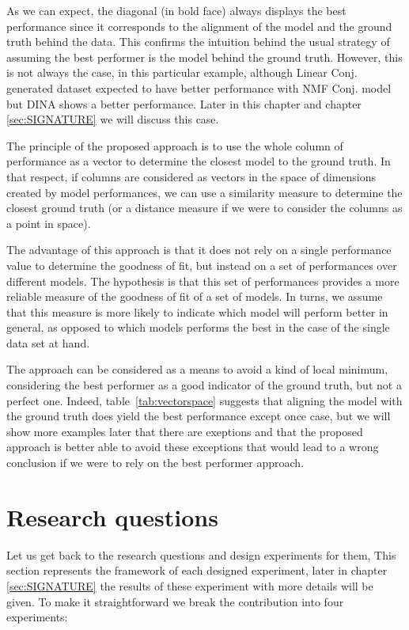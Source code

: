 As we can expect, the diagonal (in bold face) always displays the best performance since it corresponds to the alignment of the model and the ground truth behind the data.  This confirms the intuition behind the usual strategy of assuming the best performer is the model behind the ground truth.  However, this is not always the case, in this particular example, although Linear Conj. generated dataset expected to have  better performance with NMF Conj. model but DINA shows a better performance. Later in this chapter and chapter \ref{sec:SIGNATURE} we will discuss this case.



The principle of the proposed approach is to use the whole column of performance as a vector to determine the closest model to the ground truth.  In that respect, if columns are considered as vectors in the space of dimensions created by model performances, we can use a similarity measure to determine the closest ground truth (or a distance measure if we were to consider the columns as a point in space).

The advantage of this approach is that it does not rely on a single performance value to determine the goodness of fit, but instead on a set of performances over different models.  The hypothesis is that this set of performances provides a more reliable measure of the goodness of fit of a set of models.  In turns, we assume that this measure is more likely to indicate which model will perform better in general, as opposed to which models performs the best in the case of the single data set at hand.  

The approach can be considered as a means to avoid a kind of local minimum, considering the best performer as a good indicator of the ground truth, but not a perfect one. Indeed, table~\ref{tab:vectorspace} suggests that aligning the model with the ground truth does yield the best performance except once case, but we will show more examples later that there are exeptions and that the proposed approach is better able to avoid these exceptions that would lead to a wrong conclusion if we were to rely on the best performer approach.


\section{Research questions}

Let us get back to the research questions and design experiments for them, This section represents the framework of each designed experiment, later in chapter \ref{sec:SIGNATURE} the results of these experiment with more details will be given. To make it straightforward we break the contribution into four experiments:

